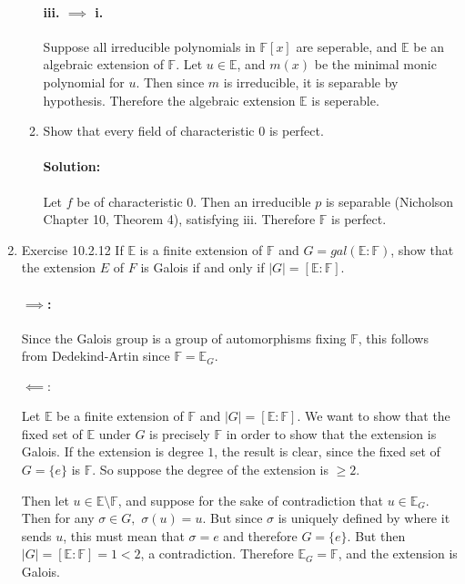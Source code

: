\documentclass{article}
\begin{document}
\begin{enumerate}
\begin{enumerate}
          \paragraph{iii. $\implies$ i. } Suppose all irreducible polynomials in $\mathbb{F}[x]$ are 
          seperable, and $\mathbb{E}$ be an algebraic extension of $\mathbb{F}$.
          Let $u\in \mathbb{E}$, and $m(x)$ be the minimal monic polynomial
          for $u$. Then since $m$ is irreducible, it is separable by hypothesis. Therefore the algebraic
          extension $\mathbb{E}$ is seperable. 


        \item Show that every field of characteristic 0 is perfect.
          \paragraph{Solution:} Let $f$ be of characteristic $0$. Then an irreducible $p$ is separable 
          (Nicholson Chapter 10, Theorem 4), satisfying iii. Therefore $\mathbb{F}$ is perfect.
      \end{enumerate}
      \newpage
\item Exercise 10.2.12 If $\mathbb{E}$ is a finite extension of $\mathbb{F}$ and 
    $G = gal( \mathbb{E} : \mathbb{F})$, show that the extension $E$ of $F$ is Galois if and only if 
    $|G| = [\mathbb{E} : \mathbb{F}]$.

    \paragraph{$\implies$:} Since the Galois group is a group of automorphisms fixing $\mathbb{F}$, this 
    follows from Dedekind-Artin since $\mathbb{F}=\mathbb{E}_G$.

    \paragraph{$\impliedby:$} Let $\mathbb{E}$ be a finite extension of $\mathbb{F}$ and 
    $|G| = [\mathbb{E} : \mathbb{F}]$. We want to show that the fixed set of $\mathbb{E}$ under $G$ is
    precisely $\mathbb{F}$ in order to show that the extension is Galois. If the extension is degree $1$,
    the result is clear, since the fixed set of $G=\{e\}$ is $\mathbb{F}$. So suppose the degree of the
    extension is $\ge 2$.

    Then let $u\in \mathbb{E}\setminus\mathbb{F}$, and suppose for the sake of contradiction that 
    $u\in \mathbb{E}_{G}$. Then for any $\sigma\in G,$ $\sigma(u)=u$. But since $\sigma$ is uniquely 
    defined by where it sends $u$, this must mean that $\sigma=e$ and therefore $G=\{e\} $. But then
    $|G|=[\mathbb{E}:\mathbb{F}]=1<2$, a contradiction. Therefore $\mathbb{E}_G=\mathbb{F}$, and the 
    extension is Galois.

\end{enumerate}
\end{document}
